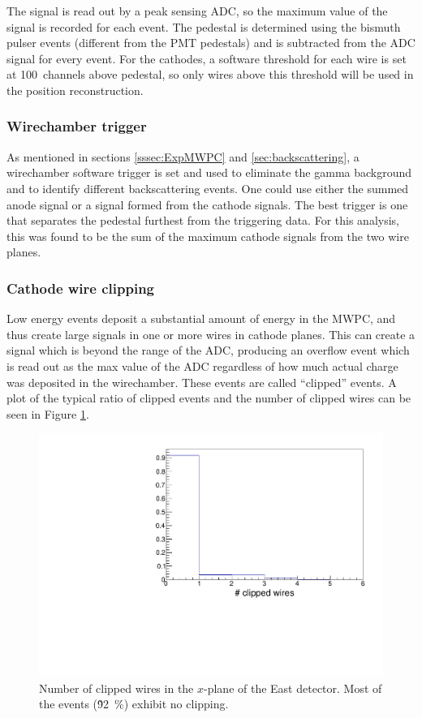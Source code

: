 The signal is read out by a peak sensing ADC, so the maximum value of the signal is recorded
for each event. The pedestal is determined using the bismuth pulser events (different from the
PMT pedestals) and is subtracted from the ADC signal for every event. For the cathodes, a software
threshold for each wire is set at 100~channels above pedestal, so only wires above this threshold
will be used in the position reconstruction.

\subsubsection{Wirechamber trigger} \label{sssec:mwpctrigg}

As mentioned in sections \ref{sssec:ExpMWPC} and \ref{sec:backscattering}, a wirechamber
software trigger is set and used to eliminate the gamma background and to identify different
backscattering events. One could use either the summed anode signal or a signal formed from
the cathode signals. The best trigger is one that separates the pedestal furthest from the
triggering data. For this analysis, this was found to be the sum of the maximum cathode
signals from the two wire planes.

\subsubsection{Cathode wire clipping}

Low energy events deposit a substantial amount of energy in the MWPC, and thus create large
signals in one or more wires in cathode planes. This can create a signal which is beyond the
range of the ADC, producing an overflow event which is read out as the max value of the ADC
regardless of how much actual charge was deposited in the wirechamber.
These events are called ``clipped'' events. A plot of the typical ratio of clipped events and the
number of clipped wires can be seen in Figure \ref{fig:nClipped}.

\begin{figure}[h]
  \centering
  \includegraphics[scale=0.6,page=1]{4-UCNACalibrations/mwpc_position.pdf} 
  \caption{Number of clipped wires in the $x$-plane of the East detector. Most of the events
    (\~92~\%) exhibit no clipping.}
  \label{fig:nClipped}
\end{figure}


